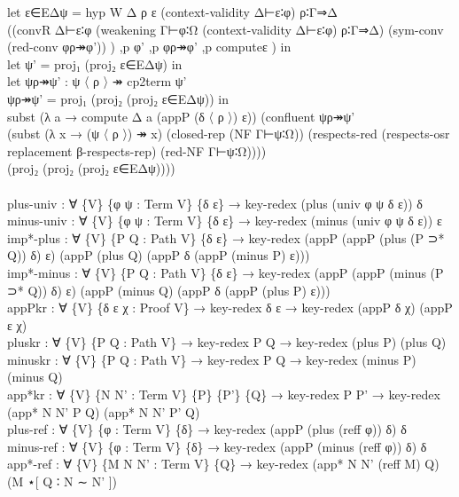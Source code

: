 {\begin{code}
{\>                      let ε∈EΔψ = hyp W Δ ρ ε (context-validity Δ⊢ε∶φ) ρ∶Γ⇒Δ        \<\\
\>                                  ((convR Δ⊢ε∶φ (weakening Γ⊢φ∶Ω (context-validity Δ⊢ε∶φ) ρ∶Γ⇒Δ) (sym-conv (red-conv φρ↠φ')) ) ,p φ' ,p φρ↠φ' ,p computeε ) in \<\\
\>                      let ψ' = proj₁ (proj₂ ε∈EΔψ) in \<\\
\>                      let ψρ↠ψ' : ψ 〈 ρ 〉 ↠ cp2term ψ'\<\\
\>                          ψρ↠ψ' = proj₁ (proj₂ (proj₂ ε∈EΔψ)) in \<\\
\>                      subst (λ a → compute Δ a (appP (δ 〈 ρ 〉) ε)) (confluent ψρ↠ψ' \<\\
\>                        (subst (λ x → (ψ 〈 ρ 〉) ↠ x) (closed-rep (NF Γ⊢ψ∶Ω)) (respects-red (respects-osr replacement β-respects-rep) (red-NF Γ⊢ψ∶Ω)))) \<\\
\>                        (proj₂ (proj₂ (proj₂ ε∈EΔψ))))\<\\
\>\<\\
\>  plus-univ : ∀ \{V\} \{φ ψ : Term V\} \{δ ε\} → key-redex (plus (univ φ ψ δ ε)) δ\<\\
\>  minus-univ : ∀ \{V\} \{φ ψ : Term V\} \{δ ε\} → key-redex (minus (univ φ ψ δ ε)) ε\<\\
\>  imp*-plus : ∀ \{V\} \{P Q : Path V\} \{δ ε\} → key-redex (appP (appP (plus (P ⊃* Q)) δ) ε) (appP (plus Q) (appP δ (appP (minus P) ε)))\<\\
\>  imp*-minus : ∀ \{V\} \{P Q : Path V\} \{δ ε\} → key-redex (appP (appP (minus (P ⊃* Q)) δ) ε) (appP (minus Q) (appP δ (appP (plus P) ε)))\<\\
\>  appPkr : ∀ \{V\} \{δ ε χ : Proof V\} → key-redex δ ε → key-redex (appP δ χ) (appP ε χ)\<\\
\>  pluskr : ∀ \{V\} \{P Q : Path V\} → key-redex P Q → key-redex (plus P) (plus Q)\<\\
\>  minuskr : ∀ \{V\} \{P Q : Path V\} → key-redex P Q → key-redex (minus P) (minus Q)\<\\
\>  app*kr : ∀ \{V\} \{N N' : Term V\} \{P\} \{P'\} \{Q\} → key-redex P P' → key-redex (app* N N' P Q) (app* N N' P' Q)\<\\
\>  plus-ref : ∀ \{V\} \{φ : Term V\} \{δ\} → key-redex (appP (plus (reff φ)) δ) δ\<\\
\>  minus-ref : ∀ \{V\} \{φ : Term V\} \{δ\} → key-redex (appP (minus (reff φ)) δ) δ\<\\
\>  app*-ref : ∀ \{V\} \{M N N' : Term V\} \{Q\} → key-redex (app* N N' (reff M) Q) (M ⋆[ Q ∶ N ∼ N' ])\<\\
}
\end{code}}
